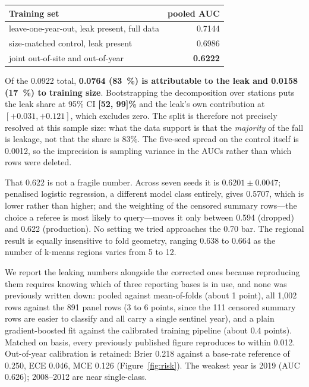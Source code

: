 \documentclass[10pt,twocolumn]{article}
\begin{document}
\begin{center}\small
\begin{tabular}{@{}lr@{}}
\toprule
Training set & pooled AUC \\
\midrule
leave-one-year-out, leak present, full data & 0.7144 \\
size-matched control, leak present          & 0.6986 \\
joint out-of-site and out-of-year           & \textbf{0.6222} \\
\bottomrule
\end{tabular}
\end{center}

\noindent
Of the 0.0922 total, \textbf{0.0764 (\SI{83}{\percent}) is attributable to the leak and
0.0158 (\SI{17}{\percent}) to training size}. Bootstrapping the decomposition over stations
puts the leak share at 95\% CI \textbf{[52, 99]\%} and the leak's own contribution at
$[+0.031, +0.121]$, which excludes zero. The split is therefore not precisely resolved at
this sample size: what the data support is that the \emph{majority} of the fall is
leakage, not that the share is 83\%. The five-seed spread on the control itself is 0.0012,
so the imprecision is sampling variance in the AUCs rather than which rows were deleted.

That 0.622 is not a fragile number. Across seven seeds it is $0.6201 \pm 0.0047$;
penalised logistic regression, a different model class entirely, gives 0.5707, which is
lower rather than higher; and the weighting of the censored summary rows---the choice a
referee is most likely to query---moves it only between 0.594 (dropped) and 0.622
(production). No setting we tried approaches the 0.70 bar. The regional result is equally
insensitive to fold geometry, ranging 0.638 to 0.664 as the number of k-means regions
varies from 5 to 12.

We report the leaking numbers alongside the corrected ones because reproducing them
requires knowing which of three reporting bases is in use, and none was previously
written down: pooled against mean-of-folds (about 1 point), all 1{,}002 rows against the
891 panel rows (3 to 6 points, since the 111 censored summary rows are easier to classify
and all carry a single sentinel year), and a plain gradient-boosted fit against the
calibrated training pipeline (about 0.4 points). Matched on basis, every previously
published figure reproduces to within 0.012. Out-of-year calibration is retained:
Brier 0.218 against a base-rate reference of 0.250, ECE 0.046, MCE 0.126
(Figure~\ref{fig:risk}). The weakest year is 2019 (AUC 0.626); 2008--2012 are near
single-class.
\end{document}
